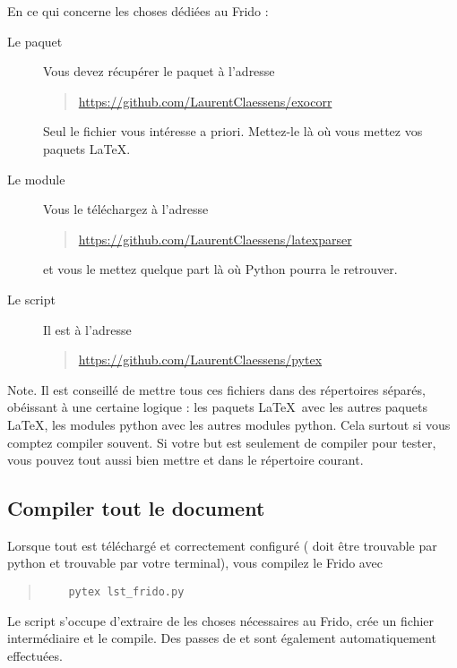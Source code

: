 En ce qui concerne les choses dédiées au Frido :
\begin{description}
    \item[Le paquet ]
        Vous devez récupérer le paquet  à l'adresse
        \begin{quote}
            \url{https://github.com/LaurentClaessens/exocorr}
        \end{quote}
        Seul le fichier  vous intéresse a priori. Mettez-le là où vous mettez vos paquets \LaTeX.
    \item[Le module ]
        Vous le téléchargez à l'adresse
        \begin{quote}
            \url{https://github.com/LaurentClaessens/latexparser}
        \end{quote}
        et vous le mettez quelque part là où Python pourra le retrouver.
    \item[Le script ]
        Il est à l'adresse
        \begin{quote}
            \url{https://github.com/LaurentClaessens/pytex}
        \end{quote}
\end{description}

Note. Il est conseillé de mettre tous ces fichiers dans des répertoires séparés, obéissant à une certaine logique : les paquets \LaTeX\ avec les autres paquets \LaTeX, les modules python avec les autres modules python. Cela surtout si vous comptez compiler souvent. Si votre but est seulement de compiler pour tester, vous pouvez tout aussi bien mettre  et  dans le répertoire courant.

\subsection{Compiler tout le document}

Lorsque tout est téléchargé et correctement configuré ( doit être trouvable par python et  trouvable par votre terminal), vous compilez le Frido avec
\begin{quote}
    \begin{verbatim}
    pytex lst_frido.py
    \end{verbatim}
\end{quote}
Le script s'occupe d'extraire de  les choses nécessaires au Frido, crée un fichier intermédiaire et le compile. Des passes de  et  sont également automatiquement effectuées.

